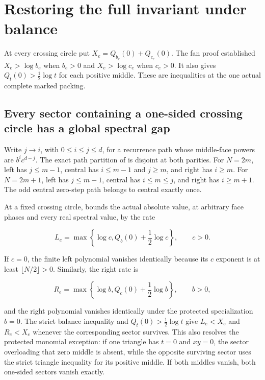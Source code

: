 \section{Restoring the full invariant under balance}\label{bl:restoring-the-full-invariant-under-balance}

At every crossing circle put \(X_e=Q_{b_e}(0)+Q_{c_e}(0)\). The fan proof established \(X_e>\log b_e\) when \(b_e>0\) and \(X_e>\log c_e\) when \(c_e>0\). It also gives \(Q_t(0)>\frac12\log t\) for each positive middle. These are inequalities at the one actual complete marked packing.

\subsection{Every sector containing a one-sided crossing circle has a global spectral gap}\label{bl:every-sector-containing-a-one-sided-crossing-circle-has-a-global-spectral-gap}

Write \(j\to i\), with \(0\le i\le j\le d\), for a recurrence path whose middle-face powers are \(b^i c^{d-j}\). The exact path partition of \cite[Section~2]{CasimirSources} is disjoint at both parities. For \(N=2m\), left has \(j\leq m-1\), central has \(i\leq m-1\) and \(j\geq m\), and right has \(i\geq m\). For \(N=2m+1\), left has \(j\leq m-1\), central has \(i\leq m\leq j\), and right has \(i\geq m+1\). The odd central zero-step path belongs to central exactly once.

At a fixed crossing circle, \cite[Theorem~1.1]{CasimirSources} bounds
the actual absolute value, at arbitrary face phases and every real
spectral value, by the rate

\begin{equation}\label{bl:B3}
L_e=\max\left\{\log c,Q_b(0)+\frac12\log c\right\},\qquad c>0.
\end{equation}

If \(c=0\), the finite left polynomial vanishes identically because its \(c\) exponent is at least \(\lfloor N/2\rfloor>0\). Similarly, the right rate is

\begin{equation}\label{bl:B4}
R_e=\max\left\{\log b,Q_c(0)+\frac12\log b\right\},\qquad b>0,
\end{equation}

and the right polynomial vanishes identically under the protected specialization \(b=0\). The strict balance inequality and \(Q_t(0)>\tfrac12\log t\) give \(L_e<X_e\) and \(R_e<X_e\) whenever the corresponding sector survives. This also resolves the protected monomial exception: if one triangle has \(t=0\) and \(xy=0\), the sector overloading that zero middle is absent, while the opposite surviving sector uses the strict triangle inequality for its positive middle. If both middles vanish, both one-sided sectors vanish exactly.

